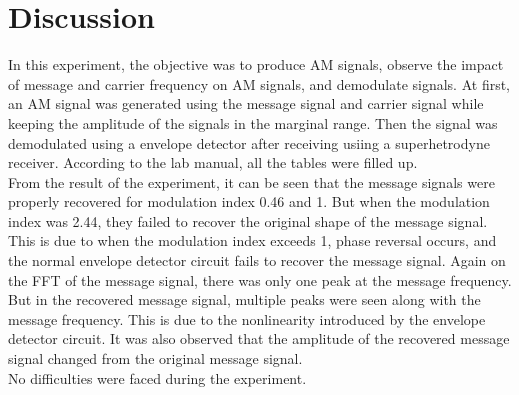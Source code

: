 \pagebreak
\section*{Discussion}

In this experiment, the objective was to produce AM signals, observe the impact of message and carrier frequency on AM signals, and demodulate signals. At first, an AM signal was generated using the message signal and carrier signal while keeping the amplitude of the signals in the marginal range. Then the signal was demodulated using a envelope detector  after receiving usiing a superhetrodyne receiver. According to the lab manual, all the tables were filled up.\\

From the result of the experiment, it can be seen that the message signals were properly recovered for modulation index 0.46 and 1. But when the modulation index was 2.44, they failed to recover the original shape of the message signal. This is due to when the modulation index exceeds 1, phase reversal occurs, and the normal envelope detector circuit fails to recover the message signal. Again on the FFT of the message signal, there was only one peak at the message frequency. But in the recovered message signal, multiple peaks were seen along with the message frequency. This is due to the nonlinearity introduced by the envelope detector circuit. It was also observed that the amplitude of the recovered message signal changed from the original message signal.\\

No difficulties were faced during the experiment.